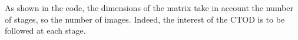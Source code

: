 \documentclass[3p,times,procedia]{elsarticle}
\begin{document}




As shown in the code, the dimensions of the matrix take in account the number of stages, so the number of images. Indeed, the interest of the CTOD is to be followed at each stage. 
\end{document}
